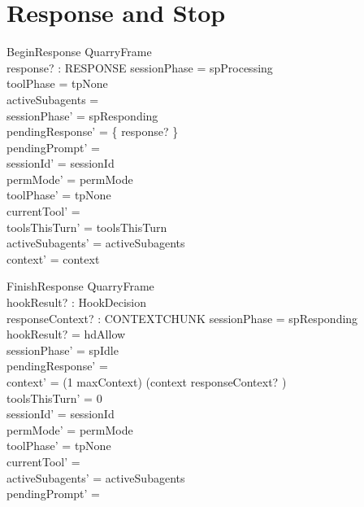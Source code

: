 \documentclass[a4paper,10pt,fleqn]{article}
\begin{document}
\section{Response and Stop}

\begin{schema}{BeginResponse}
  QuarryFrame \\
  response? : RESPONSE
  \where
  sessionPhase = spProcessing \\
  toolPhase = tpNone \\
  activeSubagents = \emptyset \\
  sessionPhase' = spResponding \\
  pendingResponse' = \{ response? \} \\
  pendingPrompt' = \emptyset \\
  sessionId' = sessionId \\
  permMode' = permMode \\
  toolPhase' = tpNone \\
  currentTool' = \emptyset \\
  toolsThisTurn' = toolsThisTurn \\
  activeSubagents' = activeSubagents \\
  context' = context
\end{schema}

\begin{schema}{FinishResponse}
  QuarryFrame \\
  hookResult? : HookDecision \\
  responseContext? : CONTEXTCHUNK
  \where
  sessionPhase = spResponding \\
  hookResult? = hdAllow \\
  sessionPhase' = spIdle \\
  pendingResponse' = \emptyset \\
  context' = (1 \upto maxContext) \dres (context \cat \langle responseContext? \rangle) \\
  toolsThisTurn' = 0 \\
  sessionId' = sessionId \\
  permMode' = permMode \\
  toolPhase' = tpNone \\
  currentTool' = \emptyset \\
  activeSubagents' = activeSubagents \\
  pendingPrompt' = \emptyset
\end{schema}
\end{document}
